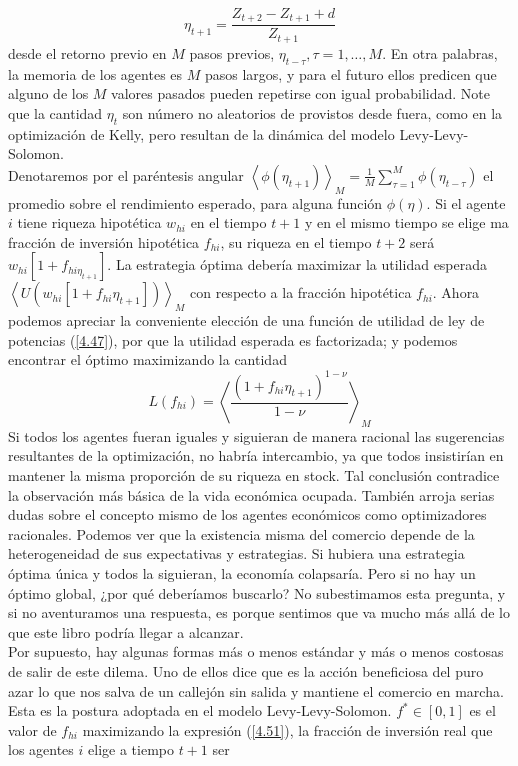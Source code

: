 \documentclass[12pt,a4paper]{article}
\begin{document}
\begin{equation}
\eta_{t+1}=\frac{Z_{t+2}-Z_{t+1}+d}{Z_{t+1}}\label{4.50}
\end{equation}
desde el retorno previo  en $M$ pasos previos, $\eta_{t-\tau},\tau=1,\dots,M$. En otra palabras, la memoria de los agentes es $M$ pasos largos, y para el futuro ellos predicen que alguno de los $M$ valores pasados pueden repetirse con igual probabilidad. Note que la cantidad $\eta_t$ son número no aleatorios de provistos desde fuera, como en la optimización de Kelly, pero resultan de la dinámica del modelo Levy-Levy-Solomon.\\
\quad Denotaremos por el paréntesis angular $\left< \phi(\eta_{t+1})\right>_M=\frac{1}{M}\sum^M_{\tau=1}\phi(\eta_{t-\tau})$ el promedio sobre el rendimiento esperado, para alguna función $\phi(\eta)$. Si el agente $i$ tiene riqueza hipotética $w_{hi}$ en el tiempo $t+1$ y en el mismo tiempo se elige ma fracción de inversión hipotética $f_{hi}$, su riqueza en el tiempo $t+2$ será $w_{hi}\left[1+f_{hi\eta_{t+1}}\right]$. La estrategia óptima debería maximizar la utilidad esperada $\left<U\left(w_{hi}\left[1+f_{hi}\eta_{t+1}\right]\right)\right>_M$ con respecto a la fracción hipotética $f_{hi}$. Ahora podemos apreciar la conveniente elección de una función de utilidad de ley de potencias (\ref{4.47}), por que la utilidad esperada es factorizada; y podemos encontrar el óptimo maximizando la cantidad
\begin{equation}
L(f_{hi})=\left<\frac{(1+f_{hi}\eta_{t+1})^{1-\nu}}{1-\nu}\right>_{M} \label{4.51}
\end{equation}
\quad Si todos los agentes fueran iguales y siguieran de manera racional las sugerencias resultantes de la optimización, no habría intercambio, ya que todos insistirían en mantener la misma proporción de su riqueza en stock. Tal conclusión contradice la observación más básica de la vida económica ocupada. También arroja serias dudas sobre el concepto mismo de los agentes económicos como optimizadores racionales. Podemos ver que la existencia misma del comercio depende de la heterogeneidad de sus expectativas y estrategias. Si hubiera una estrategia óptima única y todos la siguieran, la economía colapsaría. Pero si no hay un óptimo global, ¿por qué deberíamos buscarlo? No subestimamos esta pregunta, y si no aventuramos una respuesta, es porque sentimos que va mucho más allá de lo que este libro podría llegar a alcanzar.\\
\quad Por supuesto, hay algunas formas más o menos estándar y más o menos costosas de salir de este dilema. Uno de ellos dice que es la acción beneficiosa del puro azar lo que nos salva de un callejón sin salida y mantiene el comercio en marcha. Esta es la postura adoptada en el modelo Levy-Levy-Solomon. $ f^{*} \in [0,1] $ es el valor de $ f_{hi} $ maximizando la expresión (\ref {4.51}), la fracción de inversión real que los agentes $ i $ elige a tiempo $ t + 1 $ ser
\end{document}
